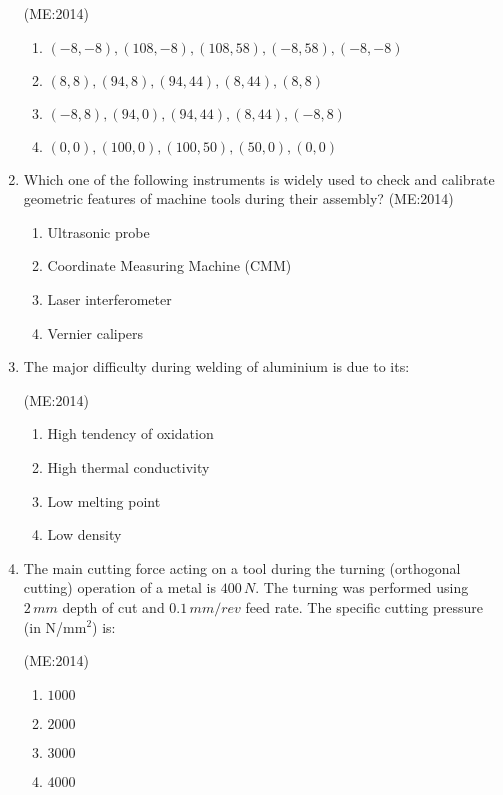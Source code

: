 \documentclass[journal,12pt,onecolumn]{IEEEtran}
\theoremstyle{remark}
\begin{document}
\begin{enumerate}
	    \hfill{(ME:2014)}
    \begin{enumerate}
        \item $(-8, -8), (108, -8), (108, 58), (-8, 58), (-8, -8)$
        \item $(8,8), (94,8), (94,44), (8,44), (8,8)$
        \item $(-8,8), (94,0), (94,44), (8,44), (-8,8)$
        \item $(0,0), (100,0), (100,50), (50,0), (0,0)$
    \end{enumerate}
\vspace{0.5cm}
    \item Which one of the following instruments is widely used to check and calibrate geometric features of machine tools during their assembly? 
	    \hfill{(ME:2014)}
    \begin{multicols}{2}
    \begin{enumerate}
        \item Ultrasonic probe
        \item Coordinate Measuring Machine (CMM)
        \item Laser interferometer
        \item Vernier calipers
    \end{enumerate}
    \end{multicols}

    \item The major difficulty during welding of aluminium is due to its: 

	    \hfill{(ME:2014)}
    \begin{multicols}{2}
    \begin{enumerate}
        \item High tendency of oxidation
        \item High thermal conductivity
        \item Low melting point
        \item Low density
    \end{enumerate}
    \end{multicols}

    \item The main cutting force acting on a tool during the turning (orthogonal cutting) operation of a metal is $400 \, N$. The turning was performed using $2 \, mm$ depth of cut and $0.1 \, mm/rev$ feed rate. The specific cutting pressure (in N/mm$^2$) is:

	    \hfill{(ME:2014)}
    \begin{multicols}{4}
    \begin{enumerate}
        \item $1000$
        \item $2000$
        \item $3000$
        \item $4000$
    \end{enumerate}
    \end{multicols}


\end{enumerate}
\end{document}
